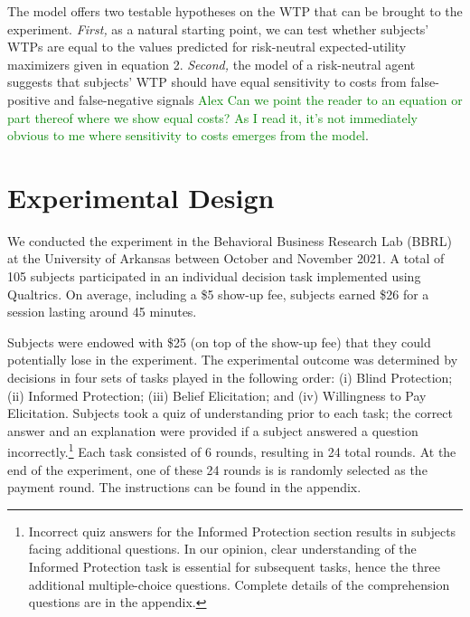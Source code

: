 \documentclass[12pt,a4paper]{article}
\begin{document}
\noindent The model offers two testable hypotheses on the WTP that can be brought to the experiment. \emph{First,} as a natural starting point, we can test whether subjects' WTPs are equal to the values predicted for risk-neutral expected-utility maximizers given in equation 2. 
\emph{Second,} the model of a risk-neutral agent suggests that subjects' WTP should have equal sensitivity to costs from false-positive and false-negative signals \textcolor{green}{\@ Alex Can we point the reader to an equation or part thereof where we show equal costs?  As I read it, it's not immediately obvious to me where sensitivity to costs emerges from the model}. 



\section{Experimental Design}

We conducted the experiment in the Behavioral Business Research Lab (BBRL) at the University of Arkansas between October and November 2021.  A total of 105 subjects participated in an individual decision task implemented using Qualtrics.  On average, including a \$5 show-up fee, subjects earned \$26 for a session lasting around 45 minutes. 
 
Subjects were endowed with \$25 (on top of the show-up fee) that they could potentially lose in the experiment. The experimental outcome was determined by decisions in four sets of tasks played in the following order: (i) Blind Protection; (ii) Informed Protection; (iii) Belief Elicitation; and (iv) Willingness to Pay Elicitation. Subjects took a quiz of understanding prior to each task; the correct answer and an explanation were provided if a subject answered a question incorrectly.\footnote{Incorrect quiz answers for the Informed Protection section results in subjects facing additional questions. In our opinion, clear understanding of the Informed Protection task is essential for subsequent tasks, hence the three additional multiple-choice questions. Complete details of the comprehension questions are in the appendix.} Each task consisted of 6 rounds, resulting in 24 total rounds. At the end of the experiment, one of these 24 rounds is is randomly selected as the payment round. The instructions can be found in the appendix.
\end{document}
